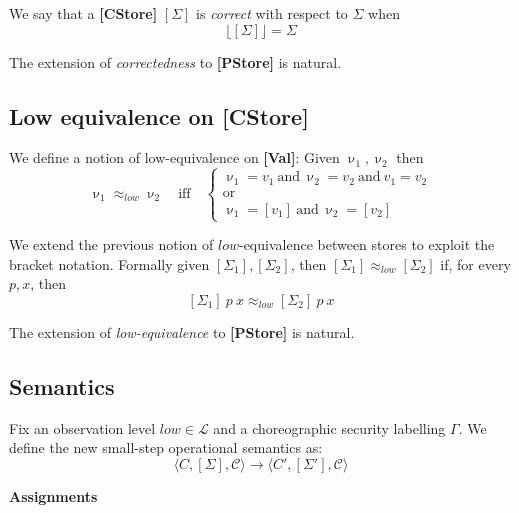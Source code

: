 \documentclass[12pt,a4paper,twoside]{book}
\newcommand{\MCL}{\mathscr{L}}
\begin{document}
We say that a \textbf{[CStore]} $[\Sigma]$ is \emph{correct} with respect to $\Sigma$ when
$$
\lfloor [\Sigma] \rfloor = \Sigma
$$

The extension of \emph{correctedness} to \textbf{[PStore]} is natural.


\subsection{Low equivalence on \textbf{[CStore]}}
We define a notion of low-equivalence on \textbf{[Val]}: Given $\upnu_1, \upnu_2$ then
\begin{equation}
\upnu_1 \approx_{low} \upnu_2
\quad\text{iff}\quad
\begin{cases}
\upnu_1 = v_1~\text{and}~\upnu_2 = v_2~\text{and}~v_1 = v_2\\
\text{or}\\
\upnu_1 = [v_1]~\text{and}~\upnu_2 = [v_2]
\end{cases}
\end{equation}

We extend the previous notion of $low$-equivalence between stores to exploit the bracket notation. Formally given $[\Sigma_1], [\Sigma_2]$, then $[\Sigma_1] \approx_{low} [\Sigma_2]$ if, for every $p, x$, then
$$
[\Sigma_1]~p~x \approx_{low} [\Sigma_2]~p~x
$$

The extension of \emph{low-equivalence} to \textbf{[PStore]} is natural.


\subsection{Semantics}

Fix an observation level $low \in \MCL$ and a choreographic security labelling $\Gamma$. We define the new small-step operational semantics as:
\[
	\langle C,[\Sigma],\mathscr{C} \rangle \rightarrow \langle C',[\Sigma'],\mathscr{C} \rangle
\]

\noindent\textbf{Assignments}
\begin{mathpar}


\end{mathpar}
\end{document}
